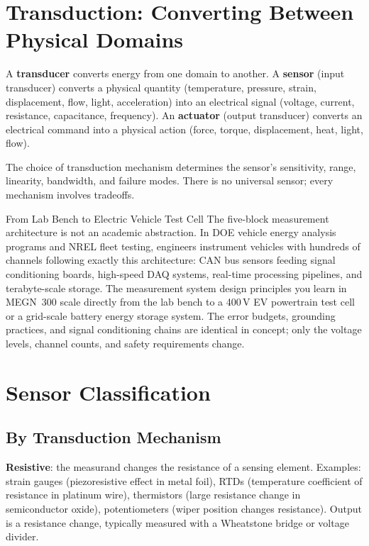 \documentclass[11pt,letterpaper,twoside,openany]{book}
\begin{document}
\section{Transduction: Converting Between Physical Domains}
A \textbf{transducer} converts energy from one domain to another. A \textbf{sensor} (input transducer) converts a physical quantity (temperature, pressure, strain, displacement, flow, light, acceleration) into an electrical signal (voltage, current, resistance, capacitance, frequency). An \textbf{actuator} (output transducer) converts an electrical command into a physical action (force, torque, displacement, heat, light, flow).

The choice of transduction mechanism determines the sensor's sensitivity, range, linearity, bandwidth, and failure modes. There is no universal sensor; every mechanism involves tradeoffs.

\begin{industrybox}{From Lab Bench to Electric Vehicle Test Cell}
The five-block measurement architecture is not an academic abstraction. In DOE vehicle energy analysis programs and NREL fleet testing, engineers instrument vehicles with hundreds of channels following exactly this architecture: CAN bus sensors feeding signal conditioning boards, high-speed DAQ systems, real-time processing pipelines, and terabyte-scale storage. The measurement system design principles you learn in MEGN~300 scale directly from the lab bench to a 400\,V EV powertrain test cell or a grid-scale battery energy storage system. The error budgets, grounding practices, and signal conditioning chains are identical in concept; only the voltage levels, channel counts, and safety requirements change.
\end{industrybox}

\section{Sensor Classification}

\subsection{By Transduction Mechanism}
\textbf{Resistive}: the measurand changes the resistance of a sensing element. Examples: strain gauges (piezoresistive effect in metal foil), RTDs (temperature coefficient of resistance in platinum wire), thermistors (large resistance change in semiconductor oxide), potentiometers (wiper position changes resistance). Output is a resistance change, typically measured with a Wheatstone bridge or voltage divider.
\end{document}
